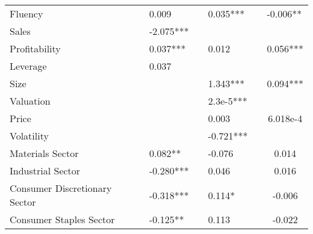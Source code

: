 \documentclass[a4paper,11pt]{report}
\begin{document}
\begin{table}[h]
\begin{tabular}{llclllc}
\multicolumn{1}{l|}{Fluency}              &  & \multicolumn{1}{l}{0.009} &  & 0.035***                                     &  & \multicolumn{1}{l}{-0.006**} \\
[1ex]
\multicolumn{1}{l|}{Sales}                &  & \multicolumn{1}{l}{-2.075***}   &  &                                             &  &                              \\
[1ex]
\multicolumn{1}{l|}{Profitability}        &  & \multicolumn{1}{l}{0.037***} &  & 0.012                                    &  &  0.056***                            \\
[1ex]
\multicolumn{1}{l|}{Leverage}             &  & \multicolumn{1}{l}{0.037} &  &                                             &  &                              \\
[1ex]
\multicolumn{1}{l|}{Size}                 &  &                              &  & 1.343***                                    &  &   0.094***                           \\
[1ex]
\multicolumn{1}{l|}{Valuation}            &  &                              &  & 2.3e-5***                                     &  &                              \\
[1ex]
\multicolumn{1}{l|}{Price}                &  &                              &  & 0.003                                    &  &      6.018e-4                        \\
[1ex]
\multicolumn{1}{l|}{Volatility}           &  &                              &  & -0.721***                                    &  &                              \\
[1ex]
\multicolumn{1}{l|}{Materials Sector}           &  &  \multicolumn{1}{l}{0.082**}                             &  &  -0.076                                    &  &    0.014                          \\
[0.5ex]
\multicolumn{1}{l|}{Industrial Sector}           &  &  \multicolumn{1}{l}{-0.280***}                             &  & 0.046                                    &  &  0.016                             \\
[0.5ex]
\multicolumn{1}{l|}{Consumer Discretionary Sector}    &  &  \multicolumn{1}{l}{-0.318***}                             &  &  0.114*                                    &  &  -0.006                             \\
[0.5ex]
\multicolumn{1}{l|}{Consumer Staples Sector}           &  &  \multicolumn{1}{l}{-0.125**}                             &  & 0.113                                    &  &  -0.022                             \\

\end{tabular}
\end{table}
\end{document}
